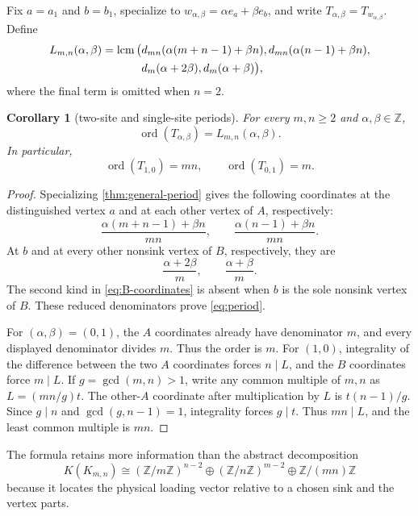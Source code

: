 \documentclass[11pt,a4paper]{amsart}
\newtheorem{corollary}[theorem]{Corollary}
\theoremstyle{definition}
\theoremstyle{remark}
\newcommand{\Z}{\mathbb Z}
\newcommand{\ord}{\operatorname{ord}}
\newcommand{\lcmop}{\operatorname{lcm}}
\begin{document}
Fix $a=a_1$ and $b=b_1$, specialize to
$w_{\alpha,\beta}=\alpha e_a+\beta e_b$, and write
$T_{\alpha,\beta}=T_{w_{\alpha,\beta}}$.  Define
\begin{align}
 L_{m,n}(\alpha,\beta)
 =\lcmop\big(&d_{mn}(\alpha(m+n-1)+\beta n),
 d_{mn}(\alpha(n-1)+\beta n),\notag\\
 &d_m(\alpha+2\beta),
 d_m(\alpha+\beta)\big),\label{eq:period}
\end{align}
where the final term is omitted when $n=2$.

\begin{corollary}[two-site and single-site periods]\label{cor:period}
For every $m,n\geq2$ and $\alpha,\beta\in\Z$,
\[
 \ord(T_{\alpha,\beta})=L_{m,n}(\alpha,\beta).
\]
In particular,
\[
 \ord(T_{1,0})=mn,\qquad \ord(T_{0,1})=m.
\]
\end{corollary}

\begin{proof}
Specializing \cref{thm:general-period} gives the following coordinates at
the distinguished vertex $a$ and at each other vertex of $A$, respectively:
\begin{equation}\label{eq:A-coordinates}
 \frac{\alpha(m+n-1)+\beta n}{mn},
 \qquad
 \frac{\alpha(n-1)+\beta n}{mn}.
\end{equation}
At $b$ and at every other nonsink vertex of $B$, respectively, they are
\begin{equation}\label{eq:B-coordinates}
 \frac{\alpha+2\beta}{m},
 \qquad
 \frac{\alpha+\beta}{m}.
\end{equation}
The second kind in \eqref{eq:B-coordinates} is absent when $b$ is the sole
nonsink vertex of $B$.  These reduced denominators prove \eqref{eq:period}.

For $(\alpha,\beta)=(0,1)$, the $A$ coordinates already have denominator
$m$, and every displayed denominator divides $m$.  Thus the order is $m$.
For $(1,0)$, integrality of the difference between the two $A$ coordinates
forces $n\mid L$, and the $B$ coordinates force $m\mid L$.  If
$g=\gcd(m,n)>1$, write any common multiple of $m,n$ as
$L=(mn/g)t$.  The other-$A$ coordinate after multiplication by $L$ is
$t(n-1)/g$.  Since $g\mid n$ and $\gcd(g,n-1)=1$, integrality forces
$g\mid t$.  Thus $mn\mid L$, and the least common multiple is $mn$.
\end{proof}

The formula retains more information than the abstract decomposition
\[
 K(K_{m,n})\cong(\Z/m\Z)^{n-2}\oplus
 (\Z/n\Z)^{m-2}\oplus\Z/(mn)\Z
\]
because it locates the physical loading vector relative to a chosen sink and
the vertex parts.
\end{document}
